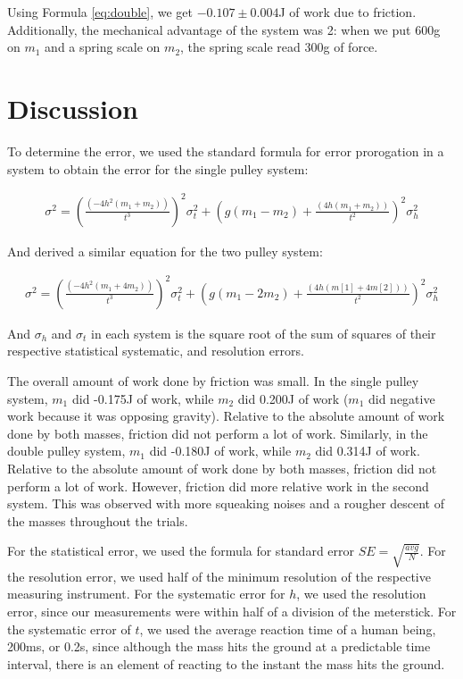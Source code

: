 \documentclass[12pt]{article}
\begin{document}
Using Formula \ref{eq:double}, we get \(-0.107 \pm 0.004\)J of work due to friction. Additionally, the mechanical advantage of the system was 2: when we put 600g on \(m_1\) and a spring scale on \(m_2\), the spring scale read 300g of force.
\section{Discussion}
\label{sec:org4358766}

To determine the error, we used the standard formula for error prorogation in a system to obtain the error for the single pulley system:

\begin{align}
\sigma^2 = \left( \frac{(-4 h^2 (m_1 + m_2))}{t^3} \right)^2 \sigma_t^2 + \left( g (m_1 - m_2) + \frac{(4 h (m_1 + m_2))}{t^2} \right) ^2 \sigma_h^2
\end{align}

And derived a similar equation for the two pulley system:

\begin{align}
\sigma^2 = \left( \frac{(-4 h^2 (m_1 + 4 m_2))}{t^3} \right) ^2 \sigma_t^2 + \left( g (m_1 - 2 m_2) + \frac{(4 h (m[1] + 4 m[2]))}{t^2} \right)^2 \sigma_h^2
\end{align}

And \(\sigma_h\) and \(\sigma_t\) in each system is the square root of the sum of squares of their respective statistical systematic, and resolution errors.

The overall amount of work done by friction was small. In the single pulley system, \(m_1\) did -0.175J of work, while \(m_2\) did 0.200J of work (\(m_1\) did negative work because it was opposing gravity). Relative to the absolute amount of work done by both masses, friction did not perform a lot of work. Similarly, in the double pulley system, \(m_1\) did -0.180J of work, while \(m_2\) did 0.314J of work. Relative to the absolute amount of work done by both masses, friction did not perform a lot of work. However, friction did more relative work in the second system. This was observed with more squeaking noises and a rougher descent of the masses throughout the trials.

For the statistical error, we used the formula for standard error \(SE = \sqrt{\frac{avg}{N}}\). For the resolution error, we used half of the minimum resolution of the respective measuring instrument. For the systematic error for \(h\), we used the resolution error, since our measurements were within half of a division of the meterstick. For the systematic error of \(t\), we used the average reaction time of a human being, 200ms, or 0.2s, since although the mass hits the ground at a predictable time interval, there is an element of reacting to the instant the mass hits the ground.
\end{document}
